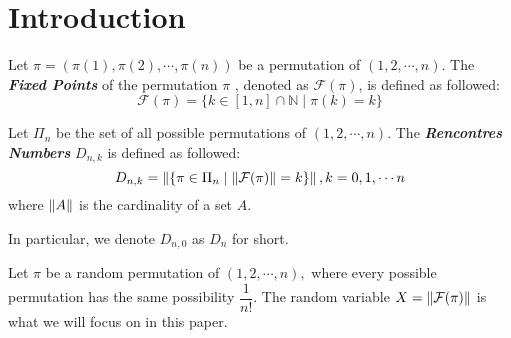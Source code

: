 
\section{Introduction}
Let $ \pi= (\pi(1), \pi(2),\cdots ,\pi(n))$ be a permutation of $ (1,2,\cdots ,n)$.
The \emph{\textbf{Fixed Points}} of the permutation $ \pi$ ,
denoted as $ \mathcal{F}(\pi)$, is defined as followed:
\[ \mathcal{F}(\pi) = \{ k \in [1,n]\cap \mathbb{N} \mid \pi(k) = k \}\]

Let $ \Pi_n$ be the set of all possible permutations of $ (1,2,\cdots ,n)$.
The \emph{\textbf{Rencontres Numbers}} $ D_{n,k}$ is defined as followed:
\[ D_{n,k} = \left\| \{ \pi \in \Pi_n \mid \left\|\mathcal{F}(\pi)\right\| = k \}\right\|, k = 0,1,\cdots n\]
where $ \left\|A\right\|$ is the cardinality of a set $ A$.

In particular, we denote $ D_{n,0}$ as $  D_{n} $ for short.

Let $ \pi $ be a random permutation of $ (1,2,\cdots ,n),$ where
every possible permutation has the same possibility $ \dfrac{1}{n!}$.
The random variable $ X = \left\|\mathcal{F}(\pi)\right\| $ is what we will focus on in this paper.

